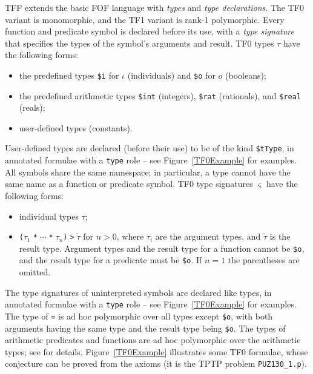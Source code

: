 \documentclass{easychair}
\begin{document}
TFF extends the basic FOF language with {\em types} and {\em type
declarations}.
The TF0 variant is monomorphic, and the TF1 variant is rank-1 polymorphic.
Every function and predicate symbol is declared before its use, with
a {\em type signature} that specifies the types of the symbol's arguments
and result.
TF0 types $\tau$ have the following forms:
\begin{itemize}
\item the predefined types {\tt \$i} for $\iota$ (individuals) and
      {\tt \$o} for $o$ (booleans);
\item the predefined arithmetic types {\tt \$int} (integers), {\tt \$rat}
      (rationals), and {\tt \$real} (reals);
\item user-defined types (constants).
\end{itemize}
User-defined types are declared (before their use) to be of the kind
{\tt \$tType}, in annotated formulae with a {\tt type} role -- see
Figure~\ref{TF0Example} for examples.
All symbols share the same namespace; in particular, a type cannot have the
same name as a function or predicate symbol.
TF0 type signatures $\varsigma$ have the following forms:
\begin{itemize}
\item individual types $\tau$;
\item {\tt ($\tau_1\;$*$\;{\cdots}\;$*$\;\tau_n$)$\;$>$\;\tilde \tau$}
      for $n > 0$, where $\tau_i$ are the argument types, and $\tilde \tau$
      is the result type.
      Argument types and the result type for a function cannot be
      {\tt \$o}, and the result type for a predicate must be {\tt \$o}.
      If $n = 1$ the parentheses are omitted.
\end{itemize}
The type signatures of uninterpreted symbols are declared like types, in
annotated formulae with a {\tt type} role -- see Figure~\ref{TF0Example}
for examples.
The type of {\tt =} is ad hoc polymorphic over all types except {\tt \$o},
with both arguments having the same type and the result type being {\tt \$o}.
The types of arithmetic predicates and functions are ad hoc polymorphic
over the arithmetic types; see \cite{SS+12} for details.
Figure~\ref{TF0Example} illustrates some TF0 formulae, whose conjecture can
be proved from the axioms (it is the TPTP problem {\tt PUZ130\_1.p}).
\end{document}
